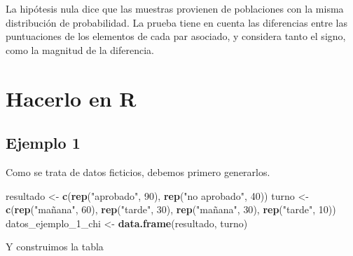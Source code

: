 \documentclass[]{book}
\newenvironment{Shaded}{\begin{snugshade}}{\end{snugshade}}
\newcommand{\DecValTok}[1]{\textcolor[rgb]{0.00,0.00,0.81}{#1}}
\newcommand{\KeywordTok}[1]{\textcolor[rgb]{0.13,0.29,0.53}{\textbf{#1}}}
\newcommand{\NormalTok}[1]{#1}
\newcommand{\OperatorTok}[1]{\textcolor[rgb]{0.81,0.36,0.00}{\textbf{#1}}}
\newcommand{\StringTok}[1]{\textcolor[rgb]{0.31,0.60,0.02}{#1}}
\begin{document}
La hipótesis nula dice que las muestras provienen de poblaciones con la
misma distribución de probabilidad. La prueba tiene en cuenta las
diferencias entre las puntuaciones de los elementos de cada par
asociado, y considera tanto el signo, como la magnitud de la diferencia.

\hypertarget{hacerlo-en-r-10}{%
\section{Hacerlo en R}\label{hacerlo-en-r-10}}

\hypertarget{ejemplo-1}{%
\subsection{Ejemplo 1}\label{ejemplo-1}}

Como se trata de datos ficticios, debemos primero generarlos.

\begin{Shaded}
\begin{Highlighting}[]
\NormalTok{resultado <-}\StringTok{ }\KeywordTok{c}\NormalTok{(}\KeywordTok{rep}\NormalTok{(}\StringTok{"aprobado"}\NormalTok{, }\DecValTok{90}\NormalTok{), }\KeywordTok{rep}\NormalTok{(}\StringTok{"no aprobado"}\NormalTok{, }\DecValTok{40}\NormalTok{))}
\NormalTok{turno <-}\StringTok{ }\KeywordTok{c}\NormalTok{(}\KeywordTok{rep}\NormalTok{(}\StringTok{"mañana"}\NormalTok{, }\DecValTok{60}\NormalTok{), }\KeywordTok{rep}\NormalTok{(}\StringTok{"tarde"}\NormalTok{, }\DecValTok{30}\NormalTok{), }\KeywordTok{rep}\NormalTok{(}\StringTok{"mañana"}\NormalTok{, }\DecValTok{30}\NormalTok{), }\KeywordTok{rep}\NormalTok{(}\StringTok{"tarde"}\NormalTok{, }\DecValTok{10}\NormalTok{))}
\NormalTok{datos_ejemplo_}\DecValTok{1}\NormalTok{_chi <-}\StringTok{ }\KeywordTok{data.frame}\NormalTok{(resultado, turno)}
\end{Highlighting}
\end{Shaded}

Y construimos la tabla

\begin{Shaded}
\end{Shaded}
\end{document}
